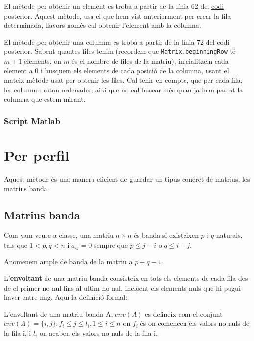 \documentclass[11pt,a4paper,twoside]{report}
\begin{document}
	El mètode per obtenir un element es troba a partir de la línia 62 del \hyperref[sec:codi1]{codi} posterior. Aquest mètode, usa el que hem vist anteriorment per crear la fila determinada, llavors només cal obtenir l'element amb la columna.
	
	El mètode per obtenir una columna es troba a partir de la línia 72 del \hyperref[sec:codi1]{codi} posterior. Sabent quantes files tenim (recordem que \texttt{Matrix.beginningRow} té $m+1$ elements, on $m$ és el nombre de files de la matriu), inicialitzem cada element a 0 i busquem els elements de cada posició de la columna, usant el mateix mètode usat per obtenir les files. Cal tenir en compte, que per cada fila, les columnes estan ordenades, així que no cal buscar més quan ja hem passat la columna que estem mirant.
	
	
	\subsubsection{Script Matlab}
	\label{sec:codi1}
	
	
	
	
	\section{Per perfil}
	
	 
	 Aquest mètode és una manera eficient de guardar un tipus concret de matrius, les matrius banda.
	 
	\subsection{Matrius banda}	 
	
	Com vam veure a classe, 
	una matriu $n \times n$ és banda si existeixen $p$ i $q$ naturals, tals que $1< p, q < n$  i $a_{i j} = 0$ sempre que $p \leq j - i$ o $q \leq i-j$. 
	
	Anomenem ample de banda de la matriu a $p + q - 1$.
	
	L'\textbf{envoltant} de una matriu banda consisteix en tots els elements de cada fila des de el primer no nul fins al ultim no nul, incloent els elements nuls que hi pugui haver entre mig.  Aquí la definició formal:
	
	L'envoltant de una matriu banda A, $env(A)$ es defineix com el conjunt $env(A) = \{i, j\} : f_i \leq j \leq l_i, 1 \leq i \leq n $ on $f_i$ és on comencen els valors no nuls de la fila i, i $l_i$ on acaben els valors no nuls de la fila i.
	
\end{document}
